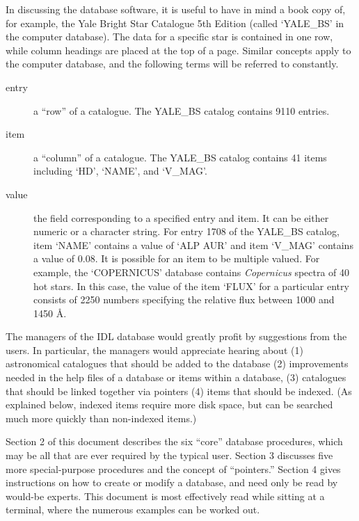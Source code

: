 In discussing the database software, it is useful to have in mind a
book copy of, for example, the Yale Bright Star Catalogue 5th Edition 
(called `YALE\_BS' in the computer database).  The data for a specific star
is contained in one row, while column headings are placed at the top of
a page.  Similar concepts apply to the computer database, and the following
terms will be referred to constantly.
\begin{description}
\item[entry]  a ``row'' of a catalogue.  The
YALE\_BS catalog contains 9110 entries.
\item[item]   a ``column'' of a catalogue.
The YALE\_BS catalog contains 41 items including `HD', `NAME', and
`V\_MAG'.  
\item[value]  the field corresponding to a specified entry and item. 
It can be either numeric or a character string.
For entry 1708 of the YALE\_BS catalog, item `NAME' contains
a value of `ALP AUR' and item `V\_MAG' contains a value of 0.08.
It is possible for an item to be multiple valued.  For example, the
`COPERNICUS'  database contains {\em Copernicus} spectra of 40 hot stars.
In this case, the value of the item `FLUX' for a particular entry
consists of 2250 numbers specifying the relative flux between 1000 and
1450 \AA.
\end{description}

The managers of the IDL database would greatly profit by suggestions from 
the users.  In particular, the managers would appreciate hearing about 
(1) astronomical
catalogues that should be added to the database  (2) improvements needed in the
help files of a database or items within a database, (3) catalogues that 
should be linked together via pointers (4) items that should
be indexed.  (As explained below, indexed items require more disk space, but
can be searched much more quickly than non-indexed items.)

Section 2 of this document describes the six ``core'' database procedures,
which may be all that are ever required by the typical user.  Section 3
discusses five more special-purpose procedures and the concept of
``pointers.''   Section 4 gives instructions on how to create or modify
a database, and need only be read by would-be experts.  
This document is most effectively read 
while sitting at a terminal, where the numerous examples can be worked out.

